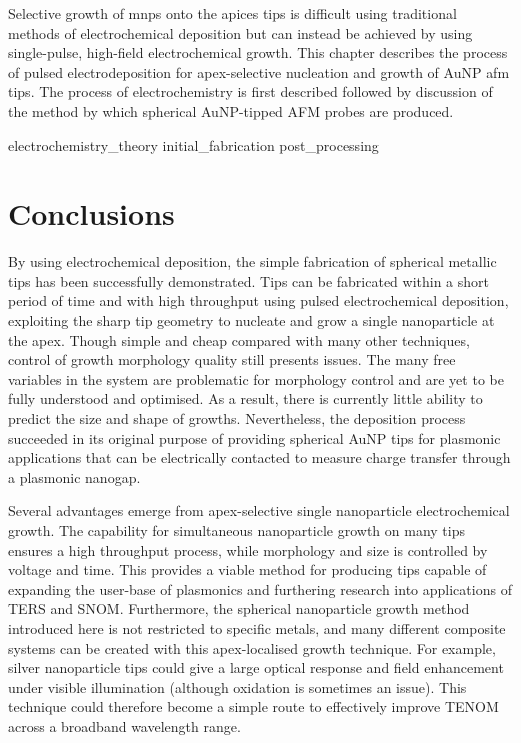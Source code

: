 \documentclass[12pt, a4paper, oneside]{book}
\begin{document}
Selective growth of \glspl{mnp} onto the apices tips is difficult using traditional methods of electrochemical deposition but can instead be achieved by using single-pulse, high-field electrochemical growth. This chapter describes the process of pulsed electrodeposition for apex-selective nucleation and growth of AuNP \gls{afm} tips. The process of electrochemistry is first described followed by discussion of the method by which spherical AuNP-tipped AFM probes are produced.

{electrochemistry_theory}
{initial_fabrication}
{post_processing}

\section{Conclusions}

By using electrochemical deposition, the simple fabrication of spherical metallic tips has been successfully demonstrated. Tips can be fabricated within a short period of time and with high throughput using pulsed electrochemical deposition, exploiting the sharp tip geometry to nucleate and grow a single nanoparticle at the apex. Though simple and cheap compared with many other techniques, control of growth morphology quality still presents issues. The many free variables in the system are problematic for morphology control and are yet to be fully understood and optimised. As a result, there is currently little ability to predict the size and shape of growths. Nevertheless, the deposition process succeeded in its original purpose of providing spherical AuNP tips for plasmonic applications that can be electrically contacted to measure charge transfer through a plasmonic nanogap.

Several advantages emerge from apex-selective single nanoparticle electrochemical growth. The capability for simultaneous nanoparticle growth on many tips ensures a high throughput process, while morphology and size is controlled by voltage and time. This provides a viable method for producing tips capable of expanding the user-base of plasmonics and furthering research into applications of TERS and SNOM. Furthermore, the spherical nanoparticle growth method introduced here is not restricted to specific metals, and many different composite systems can be created with this apex-localised growth technique. For example, silver nanoparticle tips could give a large optical response and field enhancement under visible illumination (although oxidation is sometimes an issue). This technique could therefore become a simple route to effectively improve TENOM across a broadband wavelength range.

\ifstandalone
\begin{singlespace}
\fontsize{8pt}{1em}\selectfont
\printbibliography[notcategory=fullcited]
\end{singlespace}
\fi
\end{document}
